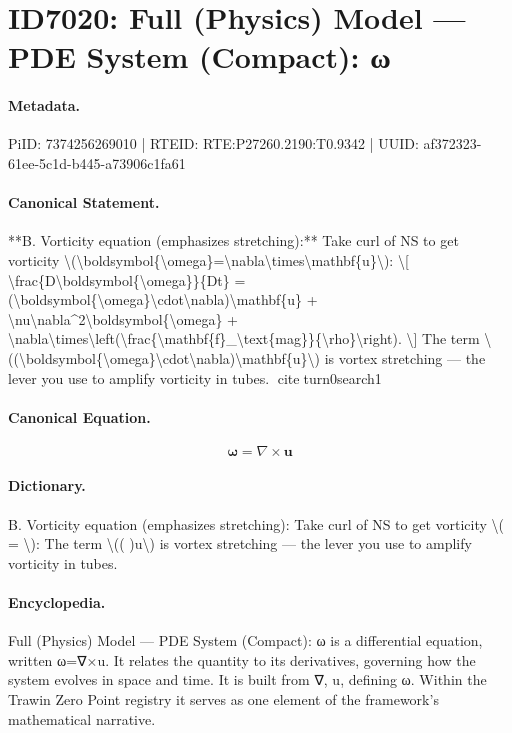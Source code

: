 \section*{ID7020: Full (Physics) Model — PDE System (Compact): ω}
\paragraph{Metadata.}
PiID: 7374256269010 | RTEID: RTE:P27260.2190:T0.9342 | UUID: af372323-61ee-5c1d-b445-a73906c1fa61

\paragraph{Canonical Statement.}
**B. Vorticity equation (emphasizes stretching):** Take curl of NS to get vorticity \textbackslash{}(\textbackslash{}boldsymbol\{\textbackslash{}omega\}=\textbackslash{}nabla\textbackslash{}times\textbackslash{}mathbf\{u\}\textbackslash{}): \textbackslash{}[ \textbackslash{}frac\{D\textbackslash{}boldsymbol\{\textbackslash{}omega\}\}\{Dt\} = (\textbackslash{}boldsymbol\{\textbackslash{}omega\}\textbackslash{}cdot\textbackslash{}nabla)\textbackslash{}mathbf\{u\} + \textbackslash{}nu\textbackslash{}nabla\textasciicircum{}2\textbackslash{}boldsymbol\{\textbackslash{}omega\} + \textbackslash{}nabla\textbackslash{}times\textbackslash{}left(\textbackslash{}frac\{\textbackslash{}mathbf\{f\}\_\textbackslash{}text\{mag\}\}\{\textbackslash{}rho\}\textbackslash{}right). \textbackslash{}] The term \textbackslash{}((\textbackslash{}boldsymbol\{\textbackslash{}omega\}\textbackslash{}cdot\textbackslash{}nabla)\textbackslash{}mathbf\{u\}\textbackslash{}) is vortex stretching — the lever you use to amplify vorticity in tubes. citeturn0search1

\paragraph{Canonical Equation.}
\[
\boldsymbol{\omega}=\nabla\times\mathbf{u}
\]

\paragraph{Dictionary.}
B. Vorticity equation (emphasizes stretching): Take curl of NS to get vorticity \textbackslash{}( = \textbackslash{}): The term \textbackslash{}(( )u\textbackslash{}) is vortex stretching — the lever you use to amplify vorticity in tubes.

\paragraph{Encyclopedia.}
Full (Physics) Model — PDE System (Compact): ω is a differential equation, written ω=∇×u. It relates the quantity to its derivatives, governing how the system evolves in space and time. It is built from ∇, u, defining ω. Within the Trawin Zero Point registry it serves as one element of the framework's mathematical narrative.
